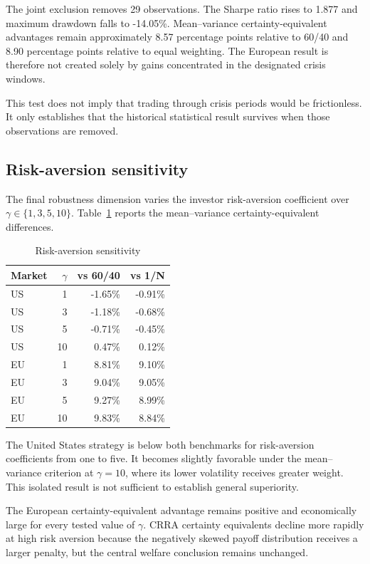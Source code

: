 The joint exclusion removes 29 observations. The Sharpe ratio rises to 1.877 and maximum drawdown falls to -14.05\%. Mean--variance certainty-equivalent advantages remain approximately 8.57 percentage points relative to 60/40 and 8.90 percentage points relative to equal weighting. The European result is therefore not created solely by gains concentrated in the designated crisis windows.

This test does not imply that trading through crisis periods would be frictionless. It only establishes that the historical statistical result survives when those observations are removed.

\subsection{Risk-aversion sensitivity}

The final robustness dimension varies the investor risk-aversion coefficient over $\gamma \in \{1,3,5,10\}$. Table~\ref{tab:gamma_robustness} reports the mean--variance certainty-equivalent differences.

\begin{table}[htbp]
\centering
\small
\caption{Risk-aversion sensitivity}
\label{tab:gamma_robustness}
\begin{tabular}{lrrr}
\toprule
Market
& $\gamma$
& vs 60/40
& vs 1/N \\
\midrule
US
& 1
& -1.65\%
& -0.91\% \\
US
& 3
& -1.18\%
& -0.68\% \\
US
& 5
& -0.71\%
& -0.45\% \\
US
& 10
& 0.47\%
& 0.12\% \\
EU
& 1
& 8.81\%
& 9.10\% \\
EU
& 3
& 9.04\%
& 9.05\% \\
EU
& 5
& 9.27\%
& 8.99\% \\
EU
& 10
& 9.83\%
& 8.84\% \\
\bottomrule
\end{tabular}
\end{table}

The United States strategy is below both benchmarks for risk-aversion coefficients from one to five. It becomes slightly favorable under the mean--variance criterion at $\gamma=10$, where its lower volatility receives greater weight. This isolated result is not sufficient to establish general superiority.

The European certainty-equivalent advantage remains positive and economically large for every tested value of $\gamma$. CRRA certainty equivalents decline more rapidly at high risk aversion because the negatively skewed payoff distribution receives a larger penalty, but the central welfare conclusion remains unchanged.

